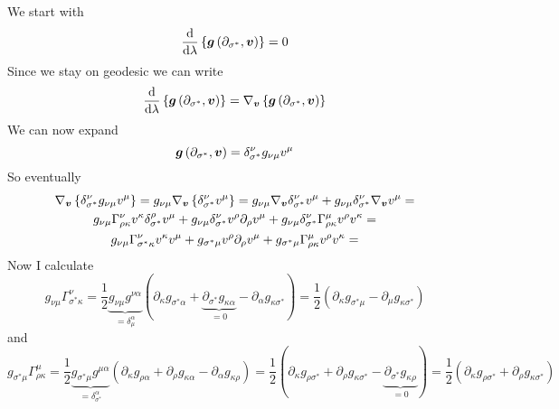 \problem

We start with 
%
\begin{equation}
    \frac{\dd}{\dd\lambda}\left\{
        \boldsymbol{g}\left(\partial_{\sigma^\ast}, \boldsymbol{v}\right)
    \right\} = 0
\end{equation}
%
Since we stay on geodesic we can write 
%
\begin{equation}
    \frac{\dd}{\dd\lambda}\left\{
        \boldsymbol{g}\left(\partial_{\sigma^\ast}, \boldsymbol{v}\right)
    \right\} =
    \nabla_{\boldsymbol{v}}\left\{
        \boldsymbol{g}\left(\partial_{\sigma^\ast}, \boldsymbol{v}\right)
    \right\} 
\end{equation}
%
We can now expand
%
\begin{equation}
    \boldsymbol{g}\left(\partial_{\sigma^\ast}, \boldsymbol{v}\right) =
    \delta^\nu_{\sigma^\ast} g_{\nu \mu}v^\mu
\end{equation}
%
So eventually
%
\begin{multline}
    \nabla_{\boldsymbol{v}}\left\{
        \delta^\nu_{\sigma^\ast} g_{\nu \mu}v^\mu
    \right\} =
    g_{\nu \mu}
    \nabla_{\boldsymbol{v}}\left\{
        \delta^\nu_{\sigma^\ast} v^\mu
    \right\} =
    g_{\nu \mu} \nabla_{\boldsymbol{v}}\delta^\nu_{\sigma^\ast}v^\mu +
    g_{\nu \mu} \delta^\nu_{\sigma^\ast}\nabla_{\boldsymbol{v}} v^\mu = \\
    g_{\nu \mu} \Gamma_{\rho \kappa}^{\nu} v^\kappa \delta^\rho_{\sigma^\ast} v^\mu +
    g_{\nu \mu} \delta^\nu_{\sigma^\ast} v^\rho \partial_\rho v^\mu + 
    g_{\nu \mu} \delta^\nu_{\sigma^\ast}\Gamma_{\rho \kappa}^{\mu} v^\rho v^\kappa = \\
    g_{\nu \mu} \Gamma_{\sigma^\ast \kappa}^{\nu} v^\kappa  v^\mu +
    g_{\sigma^\ast \mu}  v^\rho \partial_\rho v^\mu + 
    g_{\sigma^\ast \mu} \Gamma_{\rho \kappa}^{\mu} v^\rho v^\kappa =
\end{multline}
%
Now I calculate 
%
\begin{equation}
    g_{\nu \mu} \Gamma_{\sigma^\ast \kappa}^{\nu} =
    \frac{1}{2} \underbrace{g_{\nu \mu}  g^{\nu\alpha}}_{ = \delta_\mu^\alpha}
    (\partial_\kappa g_{{\sigma^\ast}\alpha} +
    \underbrace{\partial_{\sigma^\ast} g_{\kappa\alpha}}_{ = 0} - 
    \partial_\alpha g_{\kappa{\sigma^\ast}}) = 
    \frac{1}{2} 
    (\partial_\kappa g_{{\sigma^\ast}\mu} - 
    \partial_\mu g_{\kappa{\sigma^\ast}}) 
\end{equation}
%
and 
%
\begin{equation}
    g_{\sigma^\ast \mu} \Gamma_{\rho \kappa}^{\mu} = 
    \frac{1}{2} \underbrace{g_{\sigma^\ast \mu}  g^{\mu\alpha}}_{ = \delta_{\sigma^\ast}^\alpha}
    (\partial_\kappa g_{{\rho}\alpha} +
    \partial_{\rho} g_{\kappa\alpha} - 
    \partial_\alpha g_{\kappa{\rho}}) = 
    \frac{1}{2} 
    (\partial_\kappa g_{{\rho}\sigma^\ast} +
    \partial_{\rho} g_{\kappa\sigma^\ast} - 
    \underbrace{\partial_{\sigma^\ast} g_{\kappa{\rho}}}_{ = 0}) = 
    \frac{1}{2} 
    (\partial_\kappa g_{{\rho}\sigma^\ast} +
    \partial_{\rho} g_{\kappa\sigma^\ast})  
\end{equation}
